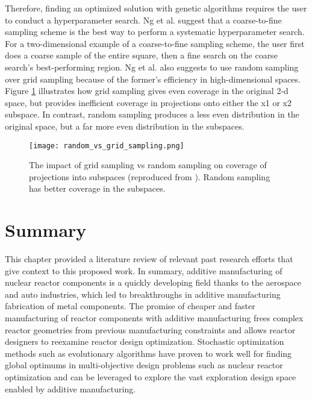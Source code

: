 Therefore, finding an optimized solution with genetic algorithms requires the user 
to conduct a hyperparameter search. 
Ng et al. \cite{ng_improving_2021} suggest that a coarse-to-fine sampling scheme 
is the best way to perform a systematic hyperparameter search.  
For a two-dimensional example of a coarse-to-fine sampling scheme, the user 
first does a coarse sample of the entire square, then a fine search on the 
coarse search's best-performing region. 
Ng et al. also suggests to use random sampling over grid sampling because of the 
former's efficiency in high-dimensional spaces. 
Figure \ref{fig:random_vs_grid_sampling} illustrates how grid sampling gives 
even coverage in the original 2-d space, but provides inefficient coverage in 
projections onto either the x1 or x2 subspace.  
In contrast, random sampling produces a less even distribution in the original 
space, but a far more even distribution in the subspaces.
\begin{figure}[]
    \centering
    \texttt{[image: random\_vs\_grid\_sampling.png]} 
    \caption{The impact of grid sampling vs random sampling on coverage of projections 
    into subspaces (reproduced from \cite{}). Random sampling has better coverage 
    in the subspaces.}
    \label{fig:random_vs_grid_sampling}
\end{figure}

\section{Summary}
This chapter provided a literature review of relevant past research 
efforts that give context to this proposed work.
In summary, additive manufacturing of nuclear reactor components is a quickly 
developing field thanks to the aerospace and auto industries, which led to 
breakthroughs in additive manufacturing fabrication of metal components. 
The promise of cheaper and faster manufacturing of reactor components with 
additive manufacturing frees complex reactor geometries from previous manufacturing constraints
and allows reactor designers to reexamine reactor design optimization.  
Stochastic optimization methods such as evolutionary algorithms have proven to 
work well for finding global optimums in multi-objective design problems such as 
nuclear reactor optimization and can be leveraged to explore the vast exploration 
design space enabled by additive manufacturing.